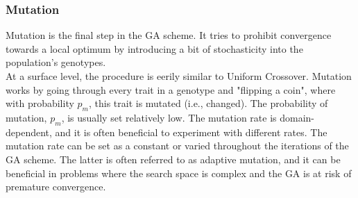\subsubsection{Mutation}
Mutation is the final step in the GA scheme. It tries to prohibit convergence towards a local optimum by introducing a bit of stochasticity into the population's genotypes.
\\
At a surface level, the procedure is eerily similar to Uniform Crossover. Mutation works by going through every trait in a genotype and "flipping a coin", where with probability $p_m$, this trait is mutated (i.e., changed). The probability of mutation,  $p_m$, is usually set relatively low. The mutation rate is domain-dependent, and it is often beneficial to experiment with different rates. The mutation rate can be set as a constant or varied throughout the iterations of the GA scheme. The latter is often referred to as adaptive mutation, and it can be beneficial in problems where the search space is complex and the GA is at risk of premature convergence.